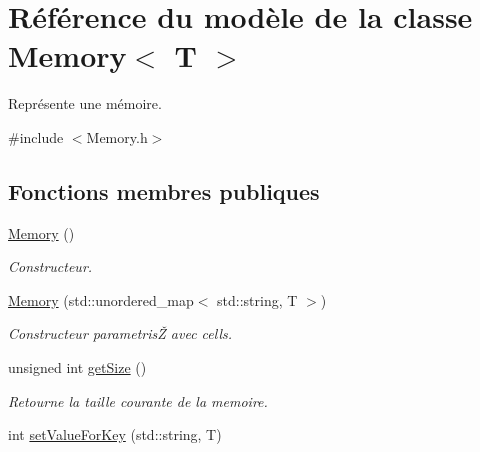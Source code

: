 \hypertarget{classMemory}{\section{Référence du modèle de la classe Memory$<$ T $>$}
\label{classMemory}
}


Représente une mémoire.  




{\ttfamily \#include $<$Memory.\-h$>$}

\subsection*{Fonctions membres publiques}
\begin{DoxyCompactItemize}
\item 
\hypertarget{classMemory_aa546b7c6e170e45a4e4f74492d8fe8bf}{\hyperlink{classMemory_aa546b7c6e170e45a4e4f74492d8fe8bf}{Memory} ()}\label{classMemory_aa546b7c6e170e45a4e4f74492d8fe8bf}

\begin{DoxyCompactList}\small\item\em Constructeur. \end{DoxyCompactList}\item 
\hypertarget{classMemory_af1e6452dbe3bb1650604140814710b95}{\hyperlink{classMemory_af1e6452dbe3bb1650604140814710b95}{Memory} (std\-::unordered\-\_\-map$<$ std\-::string, T $>$)}\label{classMemory_af1e6452dbe3bb1650604140814710b95}

\begin{DoxyCompactList}\small\item\em Constructeur parametrisŽ avec cells. \end{DoxyCompactList}\item 
\hypertarget{classMemory_add46d3ed56cf1e88efee2ed59b38c995}{unsigned int \hyperlink{classMemory_add46d3ed56cf1e88efee2ed59b38c995}{get\-Size} ()}\label{classMemory_add46d3ed56cf1e88efee2ed59b38c995}

\begin{DoxyCompactList}\small\item\em Retourne la taille courante de la memoire. \end{DoxyCompactList}\item 
\hypertarget{classMemory_a3514e7594615bb1748ba5b57259c9eca}{int \hyperlink{classMemory_a3514e7594615bb1748ba5b57259c9eca}{set\-Value\-For\-Key} (std\-::string, T)}\label{classMemory_a3514e7594615bb1748ba5b57259c9eca}


\end{DoxyCompactItemize}
